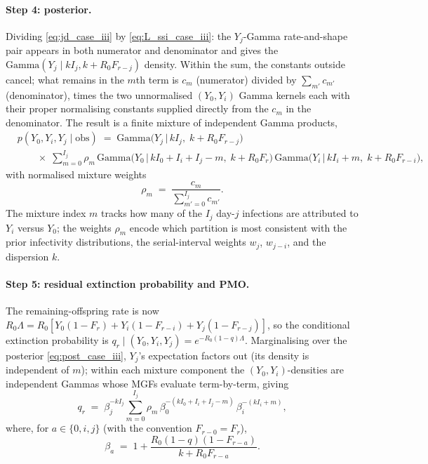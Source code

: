 \documentclass{article}
\theoremstyle{definition}
\begin{document}
\paragraph{Step 4: posterior.}
Dividing \eqref{eq:jd_case_iii} by \eqref{eq:L_ssi_case_iii}: the
$Y_j$-Gamma rate-and-shape pair appears in both numerator and
denominator and gives the
$\mathrm{Gamma}(Y_j \mid k I_j, k + R_0 F_{r-j})$ density.  Within the
sum, the constants outside cancel; what remains in the $m$th term is
$c_m$ (numerator) divided by $\sum_{m'} c_{m'}$ (denominator), times
the two unnormalised $(Y_0, Y_i)$ Gamma kernels each with their proper
normalising constants supplied directly from the $c_m$ in the
denominator.  The result is a finite mixture of independent Gamma
products,
\begin{equation}\label{eq:post_case_iii}
  \begin{aligned}
    &p(Y_0, Y_i, Y_j \mid \mathrm{obs})
    \;=\; \mathrm{Gamma}\bigl(Y_j \,\big|\, k I_j,\; k + R_0 F_{r-j}\bigr)
    \\[2pt]
    &\qquad\times\;\sum_{m=0}^{I_j} \rho_m\,
    \mathrm{Gamma}\bigl(Y_0 \,\big|\, k I_0 + I_i + I_j - m,\; k +
    R_0 F_r\bigr)\,
    \mathrm{Gamma}\bigl(Y_i \,\big|\, k I_i + m,\; k + R_0 F_{r-i}\bigr),
  \end{aligned}
\end{equation}
with normalised mixture weights
\begin{equation}\label{eq:rho_case_iii}
  \rho_m \;=\; \frac{c_m}{\sum_{m' = 0}^{I_j} c_{m'}}.
\end{equation}
The mixture index $m$ tracks how many of the $I_j$ day-$j$ infections
are attributed to $Y_i$ versus $Y_0$; the weights $\rho_m$ encode
which partition is most consistent with the prior infectivity
distributions, the serial-interval weights $w_j$, $w_{j-i}$, and the
dispersion $k$.

\paragraph{Step 5: residual extinction probability and PMO.}
The remaining-offspring rate is now
$R_0 \Lambda = R_0 [Y_0(1 - F_r) + Y_i(1 - F_{r-i}) + Y_j(1 - F_{r-j})]$,
so the conditional extinction probability is
$q_r \mid (Y_0, Y_i, Y_j) = e^{-R_0(1-q)\Lambda}$.  Marginalising
over the posterior \eqref{eq:post_case_iii}, $Y_j$'s expectation
factors out (its density is independent of $m$); within each mixture
component the $(Y_0, Y_i)$-densities are independent Gammas whose
MGFs evaluate term-by-term, giving
\begin{equation}\label{eq:qr_case_iii}
  q_r \;=\; \beta_j^{-k I_j} \sum_{m=0}^{I_j} \rho_m\,
  \beta_0^{-(k I_0 + I_i + I_j - m)}\, \beta_i^{-(k I_i + m)},
\end{equation}
where, for $a \in \{0, i, j\}$ (with the convention $F_{r-0} = F_r$),
\[
  \beta_a \;=\; 1 + \frac{R_0(1 - q)(1 - F_{r-a})}{k + R_0 F_{r-a}}.
\]
\end{document}
